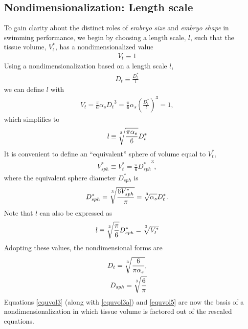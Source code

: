 \documentclass[10pt,a4paper]{article}
\def\non{\nonumber}
\def\l{\mathit{l}}
\def\Dts{D_t^*}
\def\Dt{D_t}
\def\Dss{D_{sph}^*}
\def\Ds{D_{sph}}
\def\Vts{V_t^*}
\def\Vt{V_t}
\def\Vss{V_{sph}^*}
\begin{document}

\subsection{Nondimensionalization: Length scale}
To gain clarity about the distinct roles of \textit{embryo size} and \textit{embryo shape} in swimming performance, we begin by choosing a length scale, $\l$, such that the tissue volume, $\Vts$, has a nondimensionalized value 
\begin{eqnarray}\label{equvol0}
	\Vt \equiv 1
\end{eqnarray} 
Using a nondimensionalization based on a length scale $\l$,
\begin{eqnarray}\label{equvol1}
	\Dt \equiv \frac{\Dts}{\l}
\end{eqnarray} 
we can define $\l$ with 
\begin{eqnarray}\label{equvol2}
	\Vt = \frac{\pi}{6} \alpha_s {\Dt}^3 = \frac{\pi}{6} \alpha_s \left(\frac{\Dts}{\l}\right)^3 = 1,
\end{eqnarray} 
which simplifies to
\begin{eqnarray}\label{equvol3}
	\l \equiv \sqrt[\uproot{5}3]{\frac{\pi \alpha_s}{6}} \Dts
\end{eqnarray} 
It is convenient to define an ``equivalent'' sphere of volume equal to $V_t^*$,
\begin{eqnarray}\label{equivsphere}
	\Vss \equiv \Vts = \frac{\pi}{6} {\Dss}^3,
\end{eqnarray} 
where the equivalent sphere diameter $\Dss$ is
\begin{eqnarray}\label{equvol4}
	\Dss = \sqrt[\uproot{5}3]{\frac{6 \Vss}{\pi}} = \sqrt[\uproot{5}3]{\alpha_s} \Dts .
\end{eqnarray} 
Note that $\l$ can also be expressed as
\begin{eqnarray}\label{equvol3a}
	\l \equiv \sqrt[\uproot{5}3]{\frac{\pi}{6}} \Dss = \sqrt[\uproot{5}3]{\Vts}
\end{eqnarray} 
Adopting these values, the nondimensional forms are
\begin{eqnarray}\label{equvol5}
	\Dt = \sqrt[\uproot{5}3]{\frac{6}{\pi \alpha_s}} \non, \\
	\Ds = \sqrt[\uproot{5}3]{\frac{6}{\pi}}
\end{eqnarray}
Equations \ref{equvol3} (along with \ref{equvol3a}) and \ref{equvol5} are now the basis of a nondimensionalization in which tissue volume is factored out of the rescaled equations.
\end{document}
